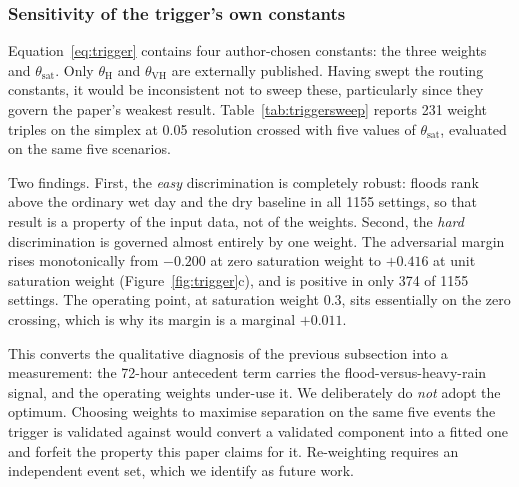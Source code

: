 \documentclass[11pt,a4paper]{article}
\begin{document}
\subsubsection*{Sensitivity of the trigger's own constants}
\label{sec:res-trigger-sweep}
Equation~\eqref{eq:trigger} contains four author-chosen constants: the three
weights and $\theta_{\mathrm{sat}}$. Only $\theta_{\mathrm{H}}$ and
$\theta_{\mathrm{VH}}$ are externally published. Having swept the routing
constants, it would be inconsistent not to sweep these, particularly since they
govern the paper's weakest result. Table~\ref{tab:triggersweep} reports 231
weight triples on the simplex at 0.05 resolution crossed with five values of
$\theta_{\mathrm{sat}}$, evaluated on the same five scenarios.

Two findings. First, the \emph{easy} discrimination is completely robust: floods
rank above the ordinary wet day and the dry baseline in all \num{1155} settings,
so that result is a property of the input data, not of the weights.
Second, the \emph{hard} discrimination is governed almost entirely by one weight.
The adversarial margin rises monotonically from $-0.200$ at zero saturation
weight to $+0.416$ at unit saturation weight
(Figure~\ref{fig:trigger}c), and is positive in only 374 of \num{1155} settings.
The operating point, at saturation weight 0.3, sits essentially on the zero
crossing, which is why its margin is a marginal $+0.011$.

This converts the qualitative diagnosis of the previous subsection into a
measurement: the 72-hour antecedent term carries the flood-versus-heavy-rain
signal, and the operating weights under-use it. We deliberately do \emph{not}
adopt the optimum. Choosing weights to maximise separation on the same five
events the trigger is validated against would convert a validated component into
a fitted one and forfeit the property this paper claims for it. Re-weighting
requires an independent event set, which we identify as future work.
\end{document}
